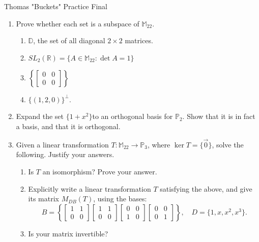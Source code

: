 \documentclass{article}
\begin{document}
    \huge Thomas "Buckets" Practice Final
    \normalsize
\begin{enumerate} 
    \item Prove whether each set is a subspace of $\mathbb{M}_{22}$.
        \begin{enumerate}[label= (\alph*)] 
            \item $\mathbb{D}$, the set of all diagonal $2\times 2$ matrices.
            \item $SL_2(\mathbb{R})=\{ A\in \mathbb{M}_{22}: \det A=1 \} $
            \item $\left\{\begin{bmatrix} 0&0\\0&0 \end{bmatrix} \right\} $
            \item $\{(1,2,0)\} ^{\perp}$.
        \end{enumerate}

    \item Expand the set $\{1+x^2\} $to an orthogonal basis for $\mathbb{P}_2$. Show that it is in fact a basis, and that it is orthogonal.

    \item Given a linear transformation $T:\mathbb{M}_{22}\to \mathbb{P}_3$, where $\ker T=\{\vec{0}\} $,
        solve the following. Justify your answers.

        \begin{enumerate}[label= (\alph*)] 
            \item Is $T$ an isomorphism? Prove your answer.

            \item Explicitly write a linear transformation $T$ satisfying the above, and give its matrix $M_{DB}(T)$,
                using the bases:
                \[
                    B=\left\{\begin{bmatrix} 1&1\\0&0 \end{bmatrix} \begin{bmatrix} 1&1\\0&0 \end{bmatrix} \begin{bmatrix} 0&0\\1&0 \end{bmatrix} \begin{bmatrix} 0&0\\0&1 \end{bmatrix} \right\}, \quad
                    D=\{1,x,x^2,x^3\} 
                .\] 
            \item Is your matrix invertible?
        \end{enumerate}
\end{enumerate}
\end{document}

